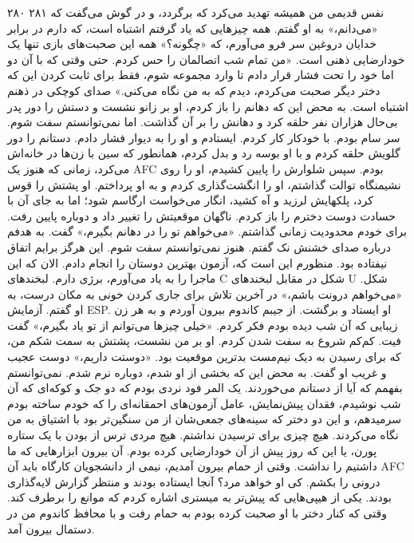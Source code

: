 ۲۸۰  
۲۸۱  
نفس قدیمی من همیشه تهدید می‌کرد که برگردد، و در گوش می‌گفت که  
«می‌دانم،» به او گفتم.  
همه چیزهایی که یاد گرفتم اشتباه است، که دارم در برابر خدایان دروغین سر فرو می‌آورم، که  
«چگونه؟»  
همه این صحبت‌های بازی تنها یک خودارضایی ذهنی است.  
«من تمام شب اتصالمان را حس کردم. حتی وقتی که با آن دو  
اما خود را تحت فشار قرار دادم تا وارد مجموعه شوم، فقط برای ثابت کردن این که  
دختر دیگر صحبت می‌کردم، دیدم که به من نگاه می‌کنی.»  
صدای کوچکی در ذهنم اشتباه است. به محض این که دهانم را باز کردم،  
او بر زانو نشست و دستش را دور پدر بی‌حال هزاران نفر حلقه کرد و دهانش را بر آن گذاشت. اما نمی‌توانستم سفت شوم. سر سام بودم.  
با خودکار کار کردم.  
ایستادم و او را به دیوار فشار دادم. دستانم را دور گلویش حلقه کردم و با او بوسه رد و بدل کردم، همانطور که سین با زن‌ها در خانه‌اش می‌کرد، زمانی که هنوز یک AFC بودم. سپس شلوارش را پایین کشیدم، او را روی نشیمنگاه توالت گذاشتم، او را انگشت‌گذاری کردم و به او پرداختم. او پشتش را قوس کرد، پلکهایش لرزید و آه کشید، انگار می‌خواست ارگاسم شود؛ اما به جای آن  
با حسادت دوست دخترم را باز کردم.  
ناگهان موقعیتش را تغییر داد و دوباره پایین رفت.  
برای خودم محدودیت زمانی گذاشتم.  
«می‌خواهم تو را در دهانم بگیرم،» گفت.  
به هدفم درباره صدای خشنش نک گفتم.  
هنوز نمی‌توانستم سفت شوم. این هرگز برایم اتفاق نیفتاده بود. منظورم این است که،  
آزمون بهترین دوستان را انجام دادم.  
الان که این ماجرا را به یاد می‌آورم، برژی دارم.  
لبخندهای C شکل در مقابل لبخندهای U شکل.  
«می‌خواهم درونت باشم،» در آخرین تلاش برای جاری کردن خونی به مکان درست، به او گفتم.  
آزمایش ESP.  
او ایستاد و برگشت. از جیبم کاندوم بیرون آوردم  
و به هر زن زیبایی که آن شب دیده بودم فکر کردم.  
«خیلی چیزها می‌توانم از تو یاد بگیرم،» گفت فیت.  
کم‌کم شروع به سفت شدن کردم. او بر من نشست، پشتش به سمت شکم من، که برای رسیدن به دیک نیم‌مست بدترین موقعیت بود.  
«دوستت داریم،» دوست عجیب و غریب او گفت.  
به محض این که بخشی از او شدم، دوباره نرم شدم. نمی‌توانستم بفهمم که آیا  
از دستانم می‌خوردند. یک المر فود نردی بودم که  
دو جک و کوکه‌ای که آن شب نوشیدم، فقدان پیش‌نمایش، عامل  
آزمون‌های احمقانه‌ای را که خودم ساخته بودم سرمیدهم، و این دو دختر که سینه‌های جمعی‌شان از من سنگین‌تر بود با اشتیاق به من نگاه می‌کردند. هیچ چیزی برای ترسیدن نداشتم. هیچ مردی  
ترس از بودن با یک ستاره پورن، یا این که روز پیش از آن خودارضایی کرده بودم.  
آن بیرون ابزارهایی که ما داشتیم را نداشت.  
وقتی از حمام بیرون آمدیم، نیمی از دانشجویان کارگاه  
باید آن AFC درونی را بکشم. کی او خواهد مرد؟  
آنجا ایستاده بودند و منتظر گزارش لایه‌گذاری بودند. یکی از هیپی‌هایی که پیش‌تر  
به میستری اشاره کردم که موانع را برطرف کند. وقتی که کنار دختر  
با او صحبت کرده بودم به حمام رفت و با محافظ کاندوم من در دستمال بیرون آمد.  
